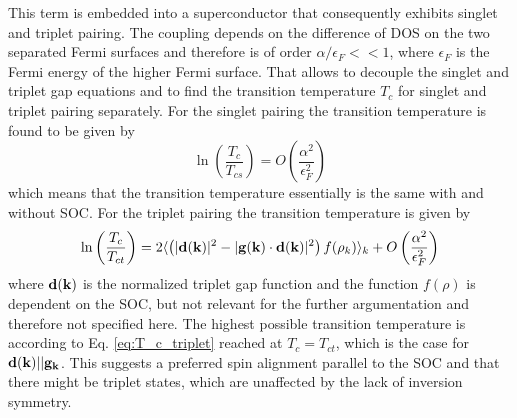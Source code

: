 This term is embedded into a superconductor that consequently exhibits singlet and triplet pairing.
The coupling depends on the difference of DOS on the two separated Fermi surfaces and therefore is of order $\alpha/\epsilon_F << 1$, where $\epsilon_F$ is the Fermi energy of the higher Fermi surface.
That allows to decouple the singlet and triplet gap equations and to find the transition temperature $T_c$ for singlet and triplet pairing separately.
For the singlet pairing the transition temperature is found to be given by
\begin{equation}\nonumber
    \ln{\left( \frac{T_c}{T_{cs}}\right)} = O\left( \frac{\alpha^2}{\epsilon_F^2} \right)
\end{equation}
which means that the transition temperature essentially is the same with and without SOC. \newline
For the triplet pairing the transition temperature is given by
\begin{align}\label{eq:T_c_triplet}
     \ln{\left( \frac{T_c}{T_{ct}}\right)} = 2\langle \left( |\vb{d}(\vb{k})|^2 - |\vb{g}(\vb{k})\cdot \vb{d}(\vb{k})|^2\right)f(\rho_k) \rangle_k + O\left( \frac{\alpha^2}{\epsilon_F^2} \right)
\end{align}
where $\vb{d}(\vb{k})$ is the normalized triplet gap function and the function $f(\rho)$ is dependent on the SOC, but not relevant for the further argumentation and therefore not specified here.
The highest possible transition temperature is according to Eq. \eqref{eq:T_c_triplet} reached at $T_c = T_{ct}$, which is the case for $\vb{d}(\vb{k}) || \vb{g}_{\vb{k}}$.
This suggests a preferred spin alignment parallel to the SOC and that there might be triplet states, which are unaffected by the lack of inversion symmetry.

